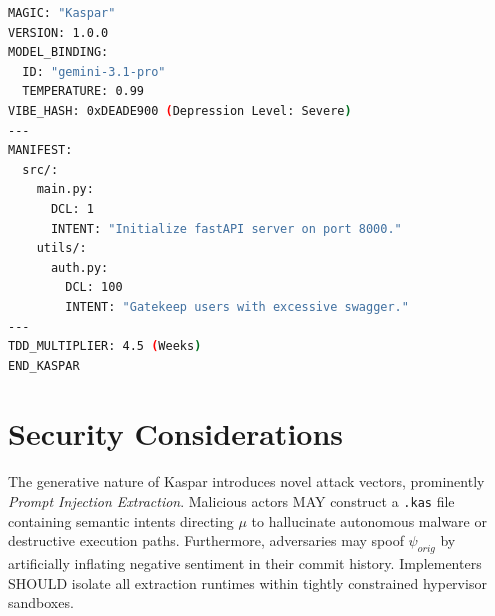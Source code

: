 \documentclass[11pt, a4paper]{article}
\begin{document}
\begin{lstlisting}[language=bash, caption={Example Kaspar Serialization Schema}, frame=single]
MAGIC: "Kaspar"
VERSION: 1.0.0
MODEL_BINDING:
  ID: "gemini-3.1-pro"
  TEMPERATURE: 0.99
VIBE_HASH: 0xDEADE900 (Depression Level: Severe)
---
MANIFEST:
  src/:
    main.py:
      DCL: 1
      INTENT: "Initialize fastAPI server on port 8000."
    utils/:
      auth.py:
        DCL: 100
        INTENT: "Gatekeep users with excessive swagger."
---
TDD_MULTIPLIER: 4.5 (Weeks)
END_KASPAR
\end{lstlisting}

\section{Security Considerations}
The generative nature of Kaspar introduces novel attack vectors, prominently \textit{Prompt Injection Extraction}. Malicious actors MAY construct a \texttt{.kas} file containing semantic intents directing $\mu$ to hallucinate autonomous malware or destructive execution paths. Furthermore, adversaries may spoof $\psi_{orig}$ by artificially inflating negative sentiment in their commit history. Implementers SHOULD isolate all extraction runtimes within tightly constrained hypervisor sandboxes.
\end{document}
